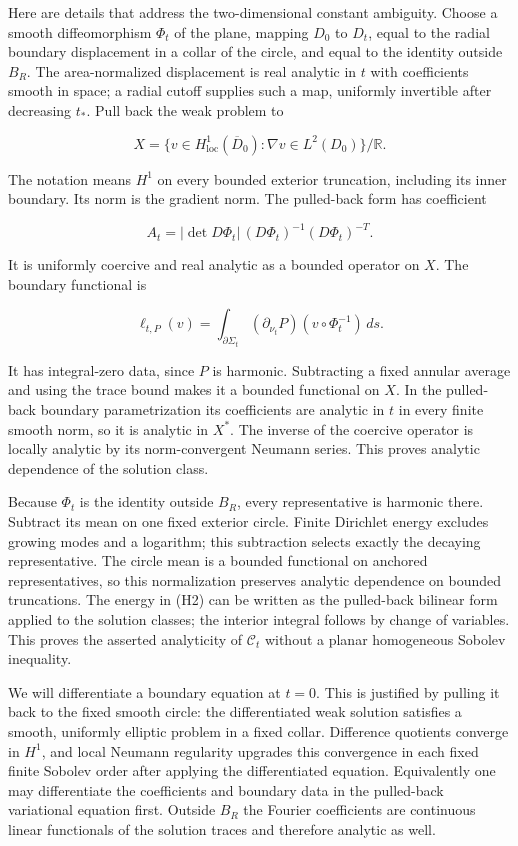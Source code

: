 \documentclass[11pt]{article}
\begin{document}
Here are details that address the two-dimensional constant ambiguity.
Choose a smooth diffeomorphism \(\Phi_t\) of the plane, mapping \(D_0\)
to \(D_t\), equal to the radial boundary displacement in a collar of the
circle, and equal to the identity outside \(B_R\). The area-normalized
displacement is real analytic in \(t\) with coefficients smooth in
space; a radial cutoff supplies such a map, uniformly invertible after
decreasing \(t_*\). Pull back the weak problem to

\[
 X=\{v\in H^1_{\mathrm{loc}}(\overline D_0):\nabla v\in L^2(D_0)\}/\mathbb R.
\]

The notation means \(H^1\) on every bounded exterior truncation,
including its inner boundary. Its norm is the gradient norm. The
pulled-back form has coefficient

\[
 A_t=|\det D\Phi_t|\,(D\Phi_t)^{-1}(D\Phi_t)^{-T}.
\]

It is uniformly coercive and real analytic as a bounded operator on
\(X\). The boundary functional is

\[
 \ell_{t,P}(v)=\int_{\partial\Sigma_t}
                    (\partial_{\nu_t}P)(v\circ\Phi_t^{-1})\,ds.
\]

It has integral-zero data, since \(P\) is harmonic. Subtracting a fixed
annular average and using the trace bound makes it a bounded functional
on \(X\). In the pulled-back boundary parametrization its coefficients
are analytic in \(t\) in every finite smooth norm, so it is analytic in
\(X^*\). The inverse of the coercive operator is locally analytic by its
norm-convergent Neumann series. This proves analytic dependence of the
solution class.

Because \(\Phi_t\) is the identity outside \(B_R\), every representative
is harmonic there. Subtract its mean on one fixed exterior circle.
Finite Dirichlet energy excludes growing modes and a logarithm; this
subtraction selects exactly the decaying representative. The circle mean
is a bounded functional on anchored representatives, so this
normalization preserves analytic dependence on bounded truncations. The
energy in (H2) can be written as the pulled-back bilinear form applied
to the solution classes; the interior integral follows by change of
variables. This proves the asserted analyticity of \(\mathcal C_t\)
without a planar homogeneous Sobolev inequality.

We will differentiate a boundary equation at \(t=0\). This is justified
by pulling it back to the fixed smooth circle: the differentiated weak
solution satisfies a smooth, uniformly elliptic problem in a fixed
collar. Difference quotients converge in \(H^1\), and local Neumann
regularity upgrades this convergence in each fixed finite Sobolev order
after applying the differentiated equation. Equivalently one may
differentiate the coefficients and boundary data in the pulled-back
variational equation first. Outside \(B_R\) the Fourier coefficients are
continuous linear functionals of the solution traces and therefore
analytic as well.
\end{document}
